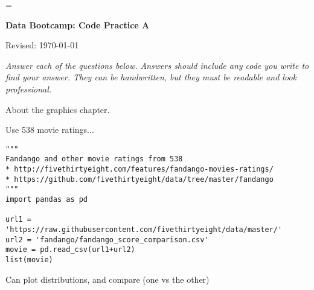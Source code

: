 \documentclass[11pt]{exam}
\begin{document}
\parskip=\bigskipamount
\parindent=0.0in
\thispagestyle{empty}


\bigskip\bigskip
\centerline{\Large \bf Data Bootcamp:  Code Practice A}
\centerline{Revised: \today}

{\it Answer each of the questions below.
Answers should include any code you write to find your answer.
They can be handwritten, but they must be readable and look professional.}

\begin{questions}
\item About the graphics chapter.


\item Use 538 movie ratings...  
\begin{verbatim}
"""
Fandango and other movie ratings from 538 
* http://fivethirtyeight.com/features/fandango-movies-ratings/
* https://github.com/fivethirtyeight/data/tree/master/fandango
"""
import pandas as pd

url1 = 'https://raw.githubusercontent.com/fivethirtyeight/data/master/'
url2 = 'fandango/fandango_score_comparison.csv'
movie = pd.read_csv(url1+url2)
list(movie)
\end{verbatim} 

Can plot distributions, and compare (one vs the other) 


\end{questions}


\end{document}
